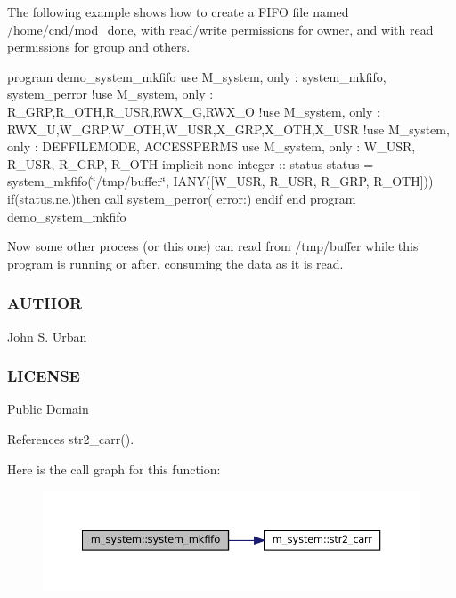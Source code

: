The following example shows how to create a F\+I\+FO file named /home/cnd/mod\+\_\+done, with read/write permissions for owner, and with read permissions for group and others.

program demo\+\_\+system\+\_\+mkfifo use M\+\_\+system, only \+: system\+\_\+mkfifo, system\+\_\+perror !use M\+\_\+system, only \+: R\+\_\+\+G\+RP,R\+\_\+\+O\+TH,R\+\_\+\+U\+SR,R\+W\+X\+\_\+G,R\+W\+X\+\_\+O !use M\+\_\+system, only \+: R\+W\+X\+\_\+U,W\+\_\+\+G\+RP,W\+\_\+\+O\+TH,W\+\_\+\+U\+SR,X\+\_\+\+G\+RP,X\+\_\+\+O\+TH,X\+\_\+\+U\+SR !use M\+\_\+system, only \+: D\+E\+F\+F\+I\+L\+E\+M\+O\+DE, A\+C\+C\+E\+S\+S\+P\+E\+R\+MS use M\+\_\+system, only \+: W\+\_\+\+U\+SR, R\+\_\+\+U\+SR, R\+\_\+\+G\+RP, R\+\_\+\+O\+TH implicit none integer \+:\+: status status = system\+\_\+mkfifo(\char`\"{}/tmp/buffer\char`\"{}, I\+A\+N\+Y(\mbox{[}\+W\+\_\+\+U\+S\+R, R\+\_\+\+U\+S\+R, R\+\_\+\+G\+R\+P, R\+\_\+\+O\+T\+H\mbox{]})) if(status.\+ne.)then call system\+\_\+perror( error\+:\textquotesingle{}) endif end program demo\+\_\+system\+\_\+mkfifo

Now some other process (or this one) can read from /tmp/buffer while this program is running or after, consuming the data as it is read.

\subsubsection*{A\+U\+T\+H\+OR}

John S. Urban \subsubsection*{L\+I\+C\+E\+N\+SE}

Public Domain 

References str2\+\_\+carr().

Here is the call graph for this function\+:\nopagebreak
\begin{figure}[H]
\begin{center}
\leavevmode
\includegraphics[width=350pt]{namespacem__system_ab2d95258ee26b85a0283538880775475_cgraph}
\end{center}
\end{figure}
\mbox{\label{namespacem__system_a622cc67c03e8cdea1d4c2430bb36081b}} 
